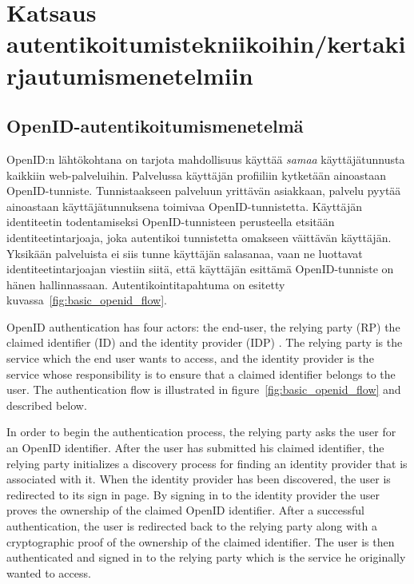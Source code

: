 \documentclass[english,gradu]{tktltiki}
\begin{document}

\section{Katsaus autentikoitumistekniikoihin/kertakirjautumismenetelmiin} %
\label{sec:katsaus_autentikoitumistekniikoihin_kertakirjautumismenetelmiin}


\subsection{OpenID-autentikoitumismenetelmä} %
\label{sub:openid_autentikoitumismenetelmä}

\label{sec:openid_auth}

OpenID:n lähtökohtana on tarjota mahdollisuus käyttää \emph{samaa} käyttäjätunnusta kaikkiin web-palveluihin.
Palvelussa käyttäjän profiiliin kytketään ainoastaan OpenID-tunniste. Tunnistaakseen palveluun yrittävän asiakkaan, palvelu pyytää ainoastaan käyttäjätunnuksena toimivaa OpenID-tunnistetta. Käyttäjän identiteetin todentamiseksi OpenID-tunnisteen perusteella etsitään identiteetintarjoaja, joka autentikoi tunnistetta omakseen väittävän käyttäjän. Yksikään palveluista ei siis tunne käyttäjän salasanaa, vaan ne luottavat identiteetintarjoajan viestiin siitä, että käyttäjän esittämä OpenID-tunniste on hänen hallinnassaan. Autentikointitapahtuma on esitetty kuvassa~\ref{fig:basic_openid_flow}.

OpenID authentication has four actors: the end-user, the relying party (RP) the claimed identifier (ID) and the identity provider (IDP) \cite{openid_2.0_platform_2009}. The relying party is the service which the end user wants to access, and the identity provider is the service whose responsibility is to ensure that a claimed identifier belongs to the user. The authentication flow is illustrated in figure~\ref{fig:basic_openid_flow} and described below.

In order to begin the authentication process, the relying party asks the user for an OpenID identifier. After the user has submitted his claimed identifier, the relying party initializes a discovery process for finding an identity provider that is associated with it. When the identity provider has been discovered, the user is redirected to its sign in page. By signing in to the identity provider the user proves the ownership of the claimed OpenID identifier. After a successful authentication, the user is redirected back to the relying party along with a cryptographic proof of the ownership of the claimed identifier. The user is then authenticated and signed in to the relying party which is the service he originally wanted to access.
\end{document}

